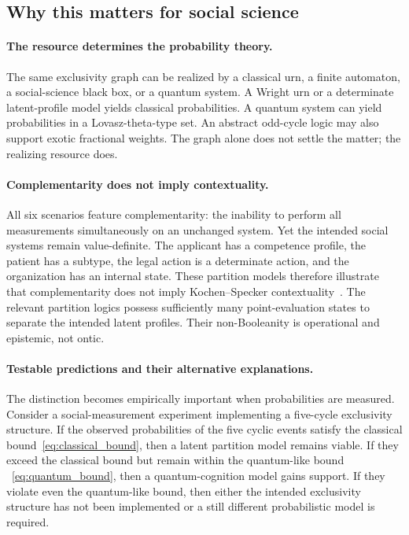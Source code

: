 \documentclass{article}
\begin{document}
\subsection{Why this matters for social science}

\paragraph{The resource determines the probability theory.}
The same exclusivity graph can be realized by a classical urn, a
finite automaton, a social-science black box, or a quantum system.
A Wright urn or a determinate latent-profile model yields classical
probabilities. A quantum system can yield probabilities in a
Lovasz-theta-type set. An abstract odd-cycle logic may also support
exotic fractional weights. The graph alone does not settle the
matter; the realizing resource does.

\paragraph{Complementarity does not imply contextuality.}
All six scenarios feature complementarity: the inability to perform
all measurements simultaneously on an unchanged system. Yet the
intended social systems remain value-definite. The applicant has a
competence profile, the patient has a subtype, the legal action is a
determinate action, and the organization has an internal state. These
partition models therefore illustrate that complementarity does not
imply Kochen--Specker contextuality~\cite{kochen1}. The relevant
partition logics possess sufficiently many point-evaluation states to
separate the intended latent profiles. Their non-Booleanity is
operational and epistemic, not ontic.

\paragraph{Testable predictions and their alternative explanations.}
The distinction becomes empirically important when probabilities are
measured. Consider a social-measurement experiment implementing a
five-cycle exclusivity structure. If the observed probabilities of
the five cyclic events satisfy the classical bound~\eqref{eq:classical_bound},
then a latent partition model remains viable. If they exceed the
classical bound but remain within the quantum-like bound
~\eqref{eq:quantum_bound}, then a quantum-cognition model gains
support. If they violate even the quantum-like bound, then either the
intended exclusivity structure has not been implemented or a still
different probabilistic model is required.
\end{document}
